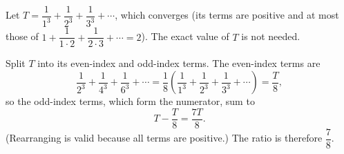 Let $T=\dfrac{1}{1^3}+\dfrac{1}{2^3}+\dfrac{1}{3^3}+\cdots$, which converges (its terms are positive and at most those of $1+\dfrac{1}{1\cdot2}+\dfrac{1}{2\cdot3}+\cdots=2$). The exact value of $T$ is not needed.

Split $T$ into its even-index and odd-index terms. The even-index terms are
\[\dfrac{1}{2^3}+\dfrac{1}{4^3}+\dfrac{1}{6^3}+\cdots=\dfrac{1}{8}\left(\dfrac{1}{1^3}+\dfrac{1}{2^3}+\dfrac{1}{3^3}+\cdots\right)=\dfrac{T}{8},\]
so the odd-index terms, which form the numerator, sum to
\[T-\dfrac{T}{8}=\dfrac{7T}{8}.\]
(Rearranging is valid because all terms are positive.) The ratio is therefore $\boxed{\dfrac{7}{8}}$.
